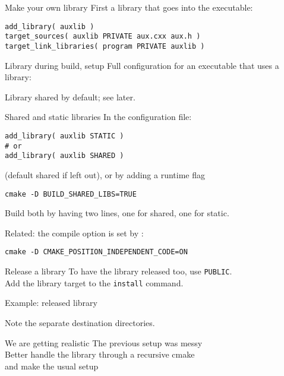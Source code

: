 \begin{numberedframe}{Make your own library}
First a library that goes into the executable:
\begin{lstlisting}
add_library( auxlib )
target_sources( auxlib PRIVATE aux.cxx aux.h )
target_link_libraries( program PRIVATE auxlib )
\end{lstlisting}
\end{numberedframe}

\begin{numberedframe}{Library during build, setup}
  Full configuration for an executable that uses a library:
  \lstset{numbers=left,numberstyle=\tiny}
    
  Library shared by default; see later.
\end{numberedframe}

\begin{numberedframe}{Shared and static libraries}
  In the configuration file:
\begin{lstlisting}
add_library( auxlib STATIC )
# or
add_library( auxlib SHARED )
\end{lstlisting}
(default shared if left out),
  or by adding a runtime flag
\begin{lstlisting}
cmake -D BUILD_SHARED_LIBS=TRUE
\end{lstlisting}
Build both by having two lines, one for shared,  one for static.

Related: the  compile option
is set by :
\begin{lstlisting}
cmake -D CMAKE_POSITION_INDEPENDENT_CODE=ON
\end{lstlisting}
\end{numberedframe}

\begin{numberedframe}{Release a library}
  To have the library released too, use \lstinline{PUBLIC}.\\
  Add the library target to the \lstinline{install} command.
\end{numberedframe}

\begin{numberedframe}{Example: released library}
  \lstset{numbers=left,numberstyle=\tiny}
    
  Note the separate destination directories.
\end{numberedframe}

\begin{numberedframe}{We are getting realistic}
  The previous setup was messy\\
  Better handle the library through a recursive cmake\\
  and make the usual    setup
\end{numberedframe}

